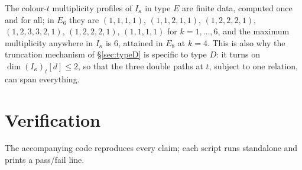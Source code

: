 \documentclass[11pt,reqno]{amsart}
\theoremstyle{plain}
\theoremstyle{definition}
\newcommand{\ka}{\kappa}
\begin{document}
The colour-$t$ multiplicity profiles of $I_\ka$ in type $E$ are finite data,
computed once and for all; in $E_6$ they are $(1,1,1,1)$, $(1,1,2,1,1)$,
$(1,2,2,2,1)$, $(1,2,3,3,2,1)$, $(1,2,2,2,1)$, $(1,1,1,1)$ for
$k=1,\dots,6$, and the maximum multiplicity anywhere in $I_\ka$ is $6$,
attained in $E_8$ at $k=4$.  This is also why the truncation mechanism of
\S\ref{sec:typeD} is specific to type $D$: it turns on
$\dim (I_\ka)_t[d]\le2$, so that the three double paths at $t$, subject to one
relation, can span everything.

\section{Verification}\label{sec:verification}

The accompanying code reproduces every claim; each script runs standalone and
prints a pass/fail line.
\end{document}
